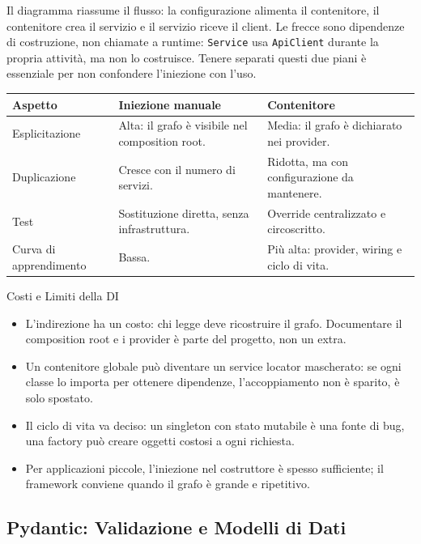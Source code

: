 \documentclass[12pt]{extarticle}
\begin{document}
\noindent Il diagramma riassume il flusso: la configurazione alimenta il contenitore, il contenitore crea il servizio e il servizio riceve il client. Le frecce sono dipendenze di costruzione, non chiamate a runtime: \texttt{Service} usa \texttt{ApiClient} durante la propria attività, ma non lo costruisce. Tenere separati questi due piani è essenziale per non confondere l'iniezione con l'uso.

\begin{center}
\small
\begin{tabular}{p{4.2cm}p{5.8cm}p{5.8cm}}
    \toprule
    \textbf{Aspetto} & \textbf{Iniezione manuale} & \textbf{Contenitore} \\
    \midrule
    Esplicitazione & Alta: il grafo è visibile nel composition root. & Media: il grafo è dichiarato nei provider. \\
    \addlinespace
    Duplicazione & Cresce con il numero di servizi. & Ridotta, ma con configurazione da mantenere. \\
    \addlinespace
    Test & Sostituzione diretta, senza infrastruttura. & Override centralizzato e circoscritto. \\
    \addlinespace
    Curva di apprendimento & Bassa. & Più alta: provider, wiring e ciclo di vita. \\
    \bottomrule
\end{tabular}
\end{center}

\begin{cbox}{Costi e Limiti della DI}
\begin{itemize}
    \item L'indirezione ha un costo: chi legge deve ricostruire il grafo. Documentare il composition root e i provider è parte del progetto, non un extra.
    \item Un contenitore globale può diventare un service locator mascherato: se ogni classe lo importa per ottenere dipendenze, l'accoppiamento non è sparito, è solo spostato.
    \item Il ciclo di vita va deciso: un singleton con stato mutabile è una fonte di bug, una factory può creare oggetti costosi a ogni richiesta.
    \item Per applicazioni piccole, l'iniezione nel costruttore è spesso sufficiente; il framework conviene quando il grafo è grande e ripetitivo.
\end{itemize}
\end{cbox}

\subsection{Pydantic: Validazione e Modelli di Dati}
\end{document}
